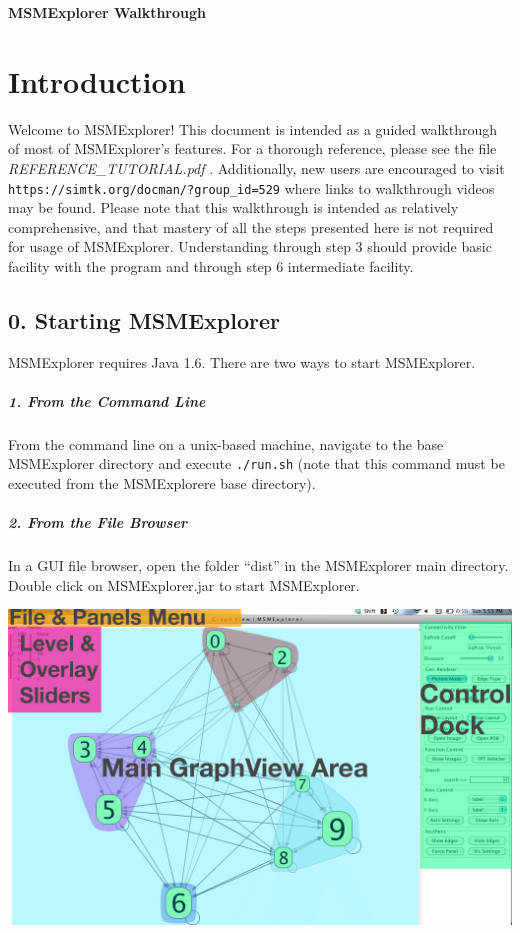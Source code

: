 \documentclass[10pt,a4paper]{report}
\begin{document}
\begin{LARGE}
\textbf{MSMExplorer Walkthrough}
\end{LARGE}
\section*{Introduction}

Welcome to MSMExplorer! This document is intended as a guided walkthrough of  most of MSMExplorer's features. For a thorough reference, please see the file \emph{REFERENCE\_TUTORIAL.pdf} . Additionally, new users are encouraged to visit   \texttt{https://simtk.org/docman/?group\_id=529} where links to walkthrough videos may be found. Please note that this walkthrough is intended as relatively comprehensive, and that mastery of all the steps presented here is not required for usage of MSMExplorer. Understanding through step 3 should provide basic facility with the program and through step 6 intermediate facility.

\subsection*{0. Starting MSMExplorer}
MSMExplorer requires Java 1.6. There are two ways to start MSMExplorer. 

\subparagraph{1. From the Command Line}
From the command line on a unix-based machine, navigate to the base MSMExplorer directory and execute \texttt{./run.sh} (note that this command must be executed from the MSMExplorere base directory).

\subparagraph*{2. From the File Browser}
In a GUI file browser, open the folder ``dist'' in the MSMExplorer main directory. Double click on MSMExplorer.jar to start MSMExplorer. 

\begin{center}
\includegraphics[scale=.25]{overview.png}
\end{center}
\end{document}
